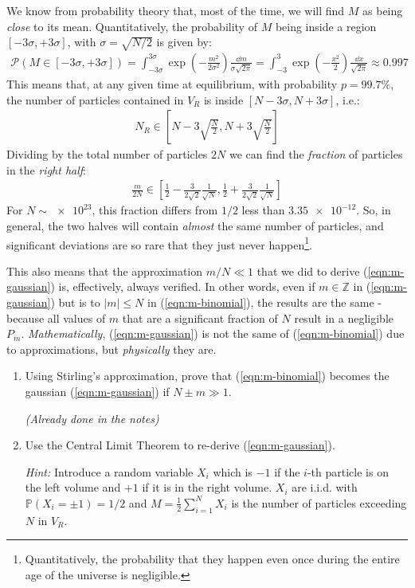 \documentclass[../../main.tex]{subfiles}
\begin{document}
We know from probability theory that, most of the time, we will find $M$ as being \textit{close} to its mean. Quantitatively, the probability of $M$ being inside a region $[-3 \sigma, +3 \sigma]$, with $\sigma = \sqrt{N/2}$ is given by: 
\begin{align*}
    \mathcal{P}(M \in [-3\sigma,+3\sigma]) = \int_{-3 \sigma}^{3 \sigma} \exp\left(-\frac{m^2}{2 \sigma^2} \right) \frac{\dd{m}}{\sigma \sqrt{2 \pi}} = \int_{-3}^3 \exp\left(-\frac{x^2}{2} \right) \frac{\dd{x}}{\sqrt{2 \pi}} \approx 0.997
\end{align*}
This means that, at any given time at equilibrium, with probability $p=99.7\%$, the number of particles contained in $V_R$ is inside $[N-3 \sigma, N+3\sigma]$, i.e.:
\begin{align*}
    N_R \in \left[N-3\sqrt{\frac{N}{2}}, N+3\sqrt{\frac{N}{2}} \right]
\end{align*}
Dividing by the total number of particles $2N$ we can find the \textit{fraction} of particles in the \textit{right half}:
\begin{align*}
    \frac{m}{2N} \in \left[\frac{1}{2}-\frac{3}{2 \sqrt{2}}\frac{1}{\sqrt{N}}, \frac{1}{2} +\frac{3}{2\sqrt{2}}\frac{1}{\sqrt{N}} \right] 
\end{align*}  
For $N \sim \num{e23}$, this fraction differs from $1/2$ less than $\num{3.35e-12}$. So, in general, the two halves will contain \textit{almost} the same number of particles, and significant deviations are so rare that they just never happen\footnote{Quantitatively, the probability that they happen even once during the entire age of the universe is negligible.}. 

\medskip

This also means that the approximation $m/N \ll 1$ that we did to derive (\ref{eqn:m-gaussian}) is, effectively, always verified. In other words, even if $m \in \mathbb{Z}$ in (\ref{eqn:m-gaussian}) but is  to $|m| \leq N$ in (\ref{eqn:m-binomial}), the results are the same - because all values of $m$ that are a significant fraction of $N$ result in a negligible $P_m$. \textit{Mathematically}, (\ref{eqn:m-gaussian}) is not the same of (\ref{eqn:m-binomial}) due to approximations, but \textit{physically} they are.  

\begin{exo}
    \begin{enumerate}    
    \item Using Stirling's approximation, prove that (\ref{eqn:m-binomial}) becomes the gaussian (\ref{eqn:m-gaussian}) if $N\pm m \gg 1$. 
    
    \textit{(Already done in the notes)} 
    \item Use the Central Limit Theorem to re-derive (\ref{eqn:m-gaussian}).
    
    \textit{Hint:} Introduce a random variable $X_i$ which is $-1$ if the $i$-th particle is on the left volume and $+1$ if it is in the right volume. $X_i$ are i.i.d. with $\mathbb{P}(X_i=\pm 1) = 1/2$ and $M=\frac{1}{2}\sum_{i=1}^N X_i$ is the number of particles exceeding $N$ in $V_R$.  
\end{enumerate}
\end{exo}
\end{document}
